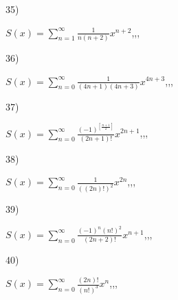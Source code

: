 \documentclass[11pt, ukrainian]{article}
\begin{document}
\par
\vspace{0.9cm}
35) \space 
{%
{$S(x)=\sum\limits_{n=1}^{\infty}{\frac{1}{n(n+2)}}{x^{{n+2}}}$},,, \par \smallskip  
}
\par
\vspace{0.9cm}
36) \space 
{%
{$S(x)=\sum\limits_{n=0}^{\infty}{\frac{1}{(4n+1)(4n+3)}}{x^{{4n+3}}}$},,, \par \smallskip  
}
\par
\vspace{0.9cm}
37) \space 
{%
{$S(x)=\sum\limits_{n=0}^{\infty}{\frac{(-1)^{[\frac{n+1}{2}]}}{(2n+1)!}}{x^{{2n+1}}}$},,, \par \smallskip  
}
\par
\vspace{0.9cm}
38) \space 
{%
{$S(x)=\sum\limits_{n=0}^{\infty}{\frac{1}{((2n)!)^2}}{x^{{2n}}}$},,, \par \smallskip  
}
\par
\vspace{0.9cm}
39) \space 
{%
{$S(x)=\sum\limits_{n=0}^{\infty}{\frac{{(-1)^n}{(n!)^2}}{(2n+2)!}}{x^{{n+1}}}$},,, \par \smallskip  
}
\par
\vspace{0.9cm}
40) \space 
{%
{$S(x)=\sum\limits_{n=0}^{\infty}{\frac{(2n)!}{(n!)^3}}{x^{{n}}}$},,, \par \smallskip  
}
\end{document}
